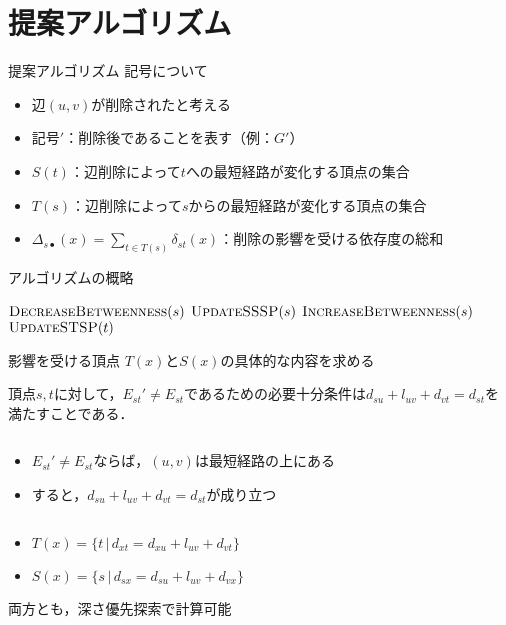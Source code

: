 \documentclass[dvipdfmx,fleqn]{beamer}
\begin{document}
\section{提案アルゴリズム}
\begin{frame}[allowframebreaks]{提案アルゴリズム}
  記号について
  \begin{itemize}\small
    \item 辺$(u,v)$が削除されたと考える
    \item 記号$'$：削除後であることを表す（例：$G'$）
    \item $S(t)$：辺削除によって$t$への最短経路が変化する頂点の集合
    \item $T(s)$：辺削除によって$s$からの最短経路が変化する頂点の集合
    \item $\Delta_{s\bullet}(x)=\sum_{t\in T(s)}\delta_{st}(x)$：削除の影響を受ける依存度の総和\cite{31Bergamini2017}
  \end{itemize}
  アルゴリズムの概略
  \begin{algorithmic}\footnotesize
    \State $\textproc{DecreaseBetweenness}(s)$
    \State $\textproc{UpdateSSSP}(s)$
    \State $\textproc{IncreaseBetweenness}(s)$
    \EndFor
    \State $\textproc{UpdateSTSP}(t)$
    \EndFor
  \end{algorithmic}
\end{frame}

\begin{frame}{影響を受ける頂点}
  $T(x)$と$S(x)$の具体的な内容を求める
  \begin{lemma}
    頂点$s,t$に対して，$E_{st}'\neq E_{st}$であるための必要十分条件は$d_{su}+l_{uv}+d_{vt}=d_{st}$を満たすことである．
  \end{lemma}
  \begin{columns}[T]
    \begin{column}{0.60\textwidth}
      \begin{itemize}
      \item $E_{st}'\neq E_{st}$ならば，$(u,v)$は最短経路の上にある
      \item すると，$d_{su}+l_{uv}+d_{vt}=d_{st}$が成り立つ
      \end{itemize}
    \end{column}
    \begin{column}{0.38\textwidth}
      \centering
      \def\svgwidth{.9\columnwidth}
      
    \end{column}
  \end{columns}
  \begin{itemize}
  \item $T(x)=\{t\,|\,d_{xt}=d_{xu}+l_{uv}+d_{vt}\}$
  \item $S(x)=\{s\,|\,d_{sx}=d_{su}+l_{uv}+d_{vx}\}$
  \end{itemize}
  両方とも，\alert{深さ優先探索}で計算可能
\end{frame}
\end{document}
